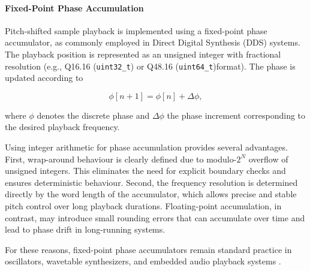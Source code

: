 \paragraph{Fixed-Point Phase Accumulation}

Pitch-shifted sample playback is implemented using a fixed-point phase accumulator, as commonly employed in Direct Digital Synthesis (DDS) systems. The playback position is represented as an unsigned integer with fractional resolution (e.g., Q16.16 (\texttt{uint32\_t}) or Q48.16 (\texttt{uint64\_t})format). The phase is updated according to

\begin{equation}
	\phi[n+1] = \phi[n] + \Delta \phi ,
\end{equation}

where $\phi$ denotes the discrete phase and $\Delta \phi$ the phase increment corresponding to the desired playback frequency.

Using integer arithmetic for phase accumulation provides several advantages. First, wrap-around behaviour is clearly defined due to modulo-$2^N$ overflow of unsigned integers. This eliminates the need for explicit boundary checks and ensures deterministic behaviour. Second, the frequency resolution is determined directly by the word length of the accumulator, which allows precise and stable pitch control over long playback durations. Floating-point accumulation, in contrast, may introduce small rounding errors that can accumulate over time and lead to phase drift in long-running systems.

For these reasons, fixed-point phase accumulators remain standard practice in oscillators, wavetable synthesizers, and embedded audio playback systems \cite{lyons_dsp, smith_pasp}.